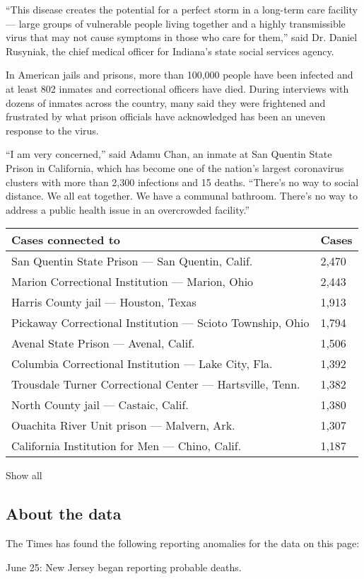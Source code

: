``This disease creates the potential for a perfect storm in a long-term
care facility --- large groups of vulnerable people living together and
a highly transmissible virus that may not cause symptoms in those who
care for them,'' said Dr. Daniel Rusyniak, the chief medical officer for
Indiana's state social services agency.

In American jails and prisons, more than 100,000 people have been
infected and at least 802 inmates and correctional officers have died.
During interviews with dozens of inmates across the country, many said
they were frightened and frustrated by what prison officials have
acknowledged has been an uneven response to the virus.

``I am very concerned,'' said Adamu Chan, an inmate at San Quentin State
Prison in California, which has become one of the nation's largest
coronavirus clusters with more than 2,300 infections and 15 deaths.
``There's no way to social distance. We all eat together. We have a
communal bathroom. There's no way to address a public health issue in an
overcrowded facility.''

\begin{longtable}[]{@{}ll@{}}
\toprule
Cases connected to & Cases\tabularnewline
\midrule
\endhead
San Quentin State Prison --- San Quentin, Calif. & 2,470 \tabularnewline
Marion Correctional Institution --- Marion, Ohio & 2,443 \tabularnewline
Harris County jail --- Houston, Texas & 1,913 \tabularnewline
Pickaway Correctional Institution --- Scioto Township, Ohio & 1,794
\tabularnewline
Avenal State Prison --- Avenal, Calif. & 1,506 \tabularnewline
Columbia Correctional Institution --- Lake City, Fla. & 1,392
\tabularnewline
Trousdale Turner Correctional Center --- Hartsville, Tenn. & 1,382
\tabularnewline
North County jail --- Castaic, Calif. & 1,380 \tabularnewline
Ouachita River Unit prison --- Malvern, Ark. & 1,307 \tabularnewline
California Institution for Men --- Chino, Calif. & 1,187 \tabularnewline
\bottomrule
\end{longtable}

Show all

\hypertarget{about-the-data}{%
\subsection{About the data}\label{about-the-data}}

The Times has found the following reporting anomalies for the data on
this page:

June 25: New Jersey began reporting probable deaths.

